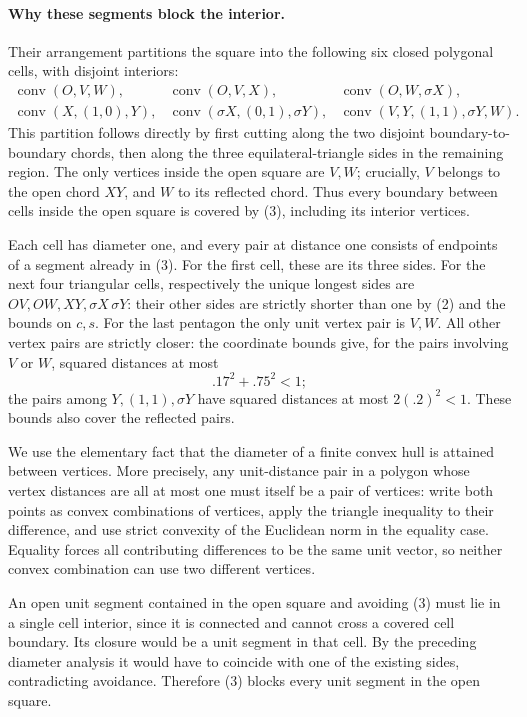 \paragraph{Why these segments block the interior.}
Their arrangement partitions the square into the following six closed polygonal cells, with disjoint interiors:
\[
\begin{array}{lll}
 \operatorname{conv}(O,V,W),&
 \operatorname{conv}(O,V,X),&
 \operatorname{conv}(O,W,\sigma X),\\
 \operatorname{conv}(X,(1,0),Y),&
 \operatorname{conv}(\sigma X,(0,1),\sigma Y),&
 \operatorname{conv}(V,Y,(1,1),\sigma Y,W).
\end{array}
 \tag{4}
\]
This partition follows directly by first cutting along the two disjoint boundary-to-boundary chords, then along the three equilateral-triangle sides in the remaining region. The only vertices inside the open square are \(V,W\); crucially, \(V\) belongs to the open chord \(XY\), and \(W\) to its reflected chord. Thus every boundary between cells inside the open square is covered by (3), including its interior vertices.

Each cell has diameter one, and every pair at distance one consists of endpoints of a segment already in (3). For the first cell, these are its three sides. For the next four triangular cells, respectively the unique longest sides are \(OV,OW,XY,\sigma X\,\sigma Y\): their other sides are strictly shorter than one by (2) and the bounds on \(c,s\).
For the last pentagon the only unit vertex pair is \(V,W\). All other vertex pairs are strictly closer: the coordinate bounds give, for the pairs involving \(V\) or \(W\), squared distances at most
\[
 .17^2+.75^2<1;
\]
the pairs among \(Y,(1,1),\sigma Y\) have squared distances at most \(2(.2)^2<1\). These bounds also cover the reflected pairs.

We use the elementary fact that the diameter of a finite convex hull is attained between vertices. More precisely, any unit-distance pair in a polygon whose vertex distances are all at most one must itself be a pair of vertices: write both points as convex combinations of vertices, apply the triangle inequality to their difference, and use strict convexity of the Euclidean norm in the equality case. Equality forces all contributing differences to be the same unit vector, so neither convex combination can use two different vertices.

An open unit segment contained in the open square and avoiding (3) must lie in a single cell interior, since it is connected and cannot cross a covered cell boundary. Its closure would be a unit segment in that cell. By the preceding diameter analysis it would have to coincide with one of the existing sides, contradicting avoidance. Therefore (3) blocks every unit segment in the open square.

